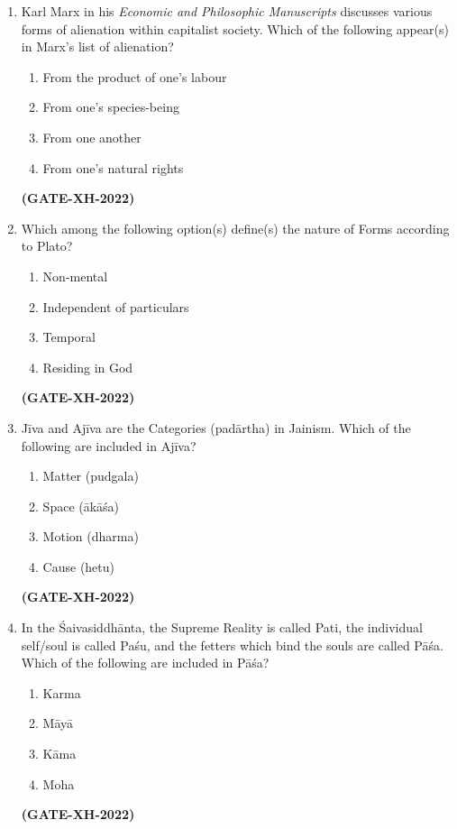 \documentclass[journal]{IEEEtran}
\begin{document}
\begin{enumerate}
\item Karl Marx in his \textit{Economic and Philosophic Manuscripts} discusses various forms of alienation within capitalist society. Which of the following appear(s) in Marx’s list of alienation?  
\begin{multicols}{2}
\begin{enumerate}
\item From the product of one’s labour  
\item From one’s species-being  
\item From one another  
\item From one’s natural rights  
\end{enumerate}
\end{multicols}
\hfill\textbf{(GATE-XH-2022)}

\item Which among the following option(s) define(s) the nature of Forms according to Plato?  
\begin{multicols}{2}
\begin{enumerate}
\item Non-mental  
\item Independent of particulars  
\item Temporal  
\item Residing in God  
\end{enumerate}
\end{multicols}
\hfill\textbf{(GATE-XH-2022)}

\item Jīva and Ajīva are the Categories (padārtha) in Jainism. Which of the following are included in Ajīva?  
\begin{multicols}{2}
\begin{enumerate}
\item Matter (pudgala)  
\item Space (ākāśa)  
\item Motion (dharma)  
\item Cause (hetu)  
\end{enumerate}
\end{multicols}
\hfill\textbf{(GATE-XH-2022)}

\item In the Śaivasiddhānta, the Supreme Reality is called Pati, the individual self/soul is called Paśu, and the fetters which bind the souls are called Pāśa. Which of the following are included in Pāśa?  
\begin{multicols}{4}
\begin{enumerate}
\item Karma  
\item Māyā  
\item Kāma  
\item Moha  
\end{enumerate}
\end{multicols}
\hfill\textbf{(GATE-XH-2022)}

\end{enumerate}
\end{document}
